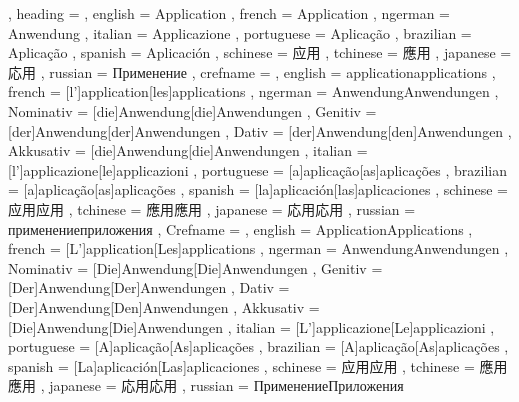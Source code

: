 
  {
    , heading =   {
                    , english     = Application
                    , french      = Application
                    , ngerman     = Anwendung
                    , italian     = Applicazione
                    , portuguese  = Aplicação
                    , brazilian   = Aplicação
                    , spanish     = Aplicación
                    , schinese    = 应用
                    , tchinese    = 應用
                    , japanese    = 応用
                    , russian     = Применение
                  }
    , crefname =  {
                    , english     = {application}{applications}
                    , french      = [l']{application}[les]{applications}
                    , ngerman     = { {Anwendung}{Anwendungen}
                                      , Nominativ = [die]{Anwendung}[die]{Anwendungen}
                                      , Genitiv   = [der]{Anwendung}[der]{Anwendungen}
                                      , Dativ     = [der]{Anwendung}[den]{Anwendungen}
                                      , Akkusativ = [die]{Anwendung}[die]{Anwendungen}
                                    }
                    , italian     = [l']{applicazione}[le]{applicazioni}
                    , portuguese  = [a]{aplicação}[as]{aplicações}
                    , brazilian   = [a]{aplicação}[as]{aplicações}
                    , spanish     = [la]{aplicación}[las]{aplicaciones}
                    , schinese    = {应用}{应用}
                    , tchinese    = {應用}{應用}
                    , japanese    = {応用}{応用}
                    , russian     = {применение}{приложения}
                  }
    , Crefname =  {
                    , english     = {Application}{Applications}
                    , french      = [L']{application}[Les]{applications}
                    , ngerman     = { {Anwendung}{Anwendungen}
                                      , Nominativ = [Die]{Anwendung}[Die]{Anwendungen}
                                      , Genitiv   = [Der]{Anwendung}[Der]{Anwendungen}
                                      , Dativ     = [Der]{Anwendung}[Den]{Anwendungen}
                                      , Akkusativ = [Die]{Anwendung}[Die]{Anwendungen}
                                    }
                    , italian     = [L']{applicazione}[Le]{applicazioni}
                    , portuguese  = [A]{aplicação}[As]{aplicações}
                    , brazilian   = [A]{aplicação}[As]{aplicações}
                    , spanish     = [La]{aplicación}[Las]{aplicaciones}
                    , schinese    = {应用}{应用}
                    , tchinese    = {應用}{應用}
                    , japanese    = {応用}{応用}
                    , russian     = {Применение}{Приложения}
                  }
  }

